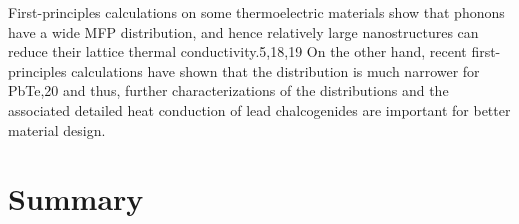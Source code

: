 \documentclass[aps,prb,twocolumn,superscriptaddress,preprintnumbers,amsmath,amssymb,floatfix]{revtex4}
\begin{document}
First-principles calculations on some thermoelectric
materials show that phonons have a wide MFP distribution,
and hence relatively large nanostructures can reduce their
lattice thermal conductivity.5,18,19 On the other hand, recent
first-principles calculations have shown that the distribution is
much narrower for PbTe,20 and thus, further characterizations
of the distributions and the associated detailed heat conduction
of lead chalcogenides are important for better material design.
\section{\label{S:}Summary}


\appendix
\end{document}
